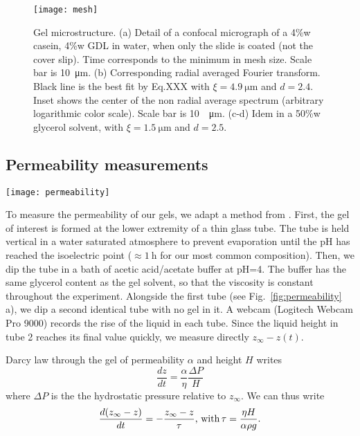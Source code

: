 \documentclass[twocolumn,superscriptaddress,showpacs,preprintnumbers,amsmath,amssymb,prl]{revtex4-1}
\begin{document}
\begin{figure}
	\texttt{[image: mesh]}
	\caption{Gel microstructure. (a) Detail of a confocal micrograph of a 4\%w casein, 4\%w GDL in water, when only the slide is coated (not the cover slip). Time corresponds to the minimum in mesh size. Scale bar is \SI{10}{\micro\metre}. (b) Corresponding radial averaged Fourier transform. Black line is the best fit by Eq.XXX with $\xi=\SI{4.9}{\micro\metre}$ and $d=2.4$. Inset shows the center of the non radial average spectrum (arbitrary logarithmic color scale). Scale bar is \SI{10}{\per\micro\metre}. (c-d) Idem in a 50\%w glycerol solvent, with $\xi=\SI{1.5}{\micro\metre}$ and $d=2.5$.}
	\label{fig:mesh}
\end{figure}

\subsection*{Permeability measurements}
\begin{figure*}
	\texttt{[image: permeability]}
	\caption{Permeability measurements. (a) Schematic representation of the experiment. (b-c) Evolution of the height of the interface in tube 1 relative to the final height in tube 2. Black line is the best exponential fit $Ae^{-t/\tau}$. (b) Gel is 4\%w casein, 4\%w GDL in water, $H=\SI{2.3}{\milli\metre}$ and $\tau=\SI{57}{\minute}$. (c) Idem in 50\%w glycerol, $H=\SI{4}{\milli\metre}$ and $\tau=\SI{100}{\hour}$.}
	\label{fig:permeability}
\end{figure*}

To measure the permeability of our gels, we adapt a method from \cite{VanDijk1986}. First, the gel of interest is formed at the lower extremity of a thin glass tube. The tube is held vertical in a water saturated atmosphere to prevent evaporation until the pH has reached the isoelectric point ($\approx\SI{1}{\hour}$ for our most common composition). Then, we dip the tube in a bath of acetic acid/acetate buffer at pH=4. The buffer has the same glycerol content as the gel solvent, so that the viscosity is constant throughout the experiment. Alongside the first tube (see Fig.~\ref{fig:permeability} a), we dip a second identical tube with no gel in it. A webcam (Logitech Webcam Pro 9000) records the rise of the liquid in each tube. Since the liquid height in tube 2 reaches its final value quickly, we measure directly $z_\infty-z(t)$.

Darcy law through the gel of permeability $\alpha$ and height $H$ writes
\begin{equation}
\frac{dz}{dt} = \frac{\alpha}{\eta}\frac{\Delta P}{H}
\end{equation}
where $\Delta P$ is the the hydrostatic pressure relative to $z_\infty$. We can thus write
\begin{equation}
\frac{d(z_\infty-z)}{dt} = -\frac{z_\infty-z}{\tau}\text{, with\,} \tau = \frac{\eta H}{\alpha \rho g}.
\end{equation}
\end{document}
